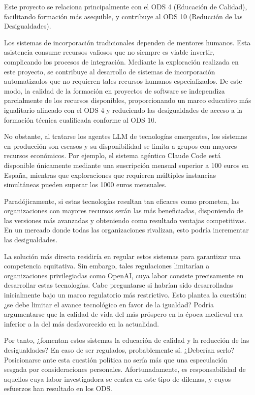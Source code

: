 Este proyecto se relaciona principalmente con el ODS 4 (Educación de Calidad), facilitando formación más asequible, y contribuye al ODS 10 (Reducción de las Desigualdades).

Los sistemas de incorporación tradicionales dependen de mentores humanos. Esta asistencia consume recursos valiosos que no siempre es viable invertir, complicando los procesos de integración. Mediante la exploración realizada en este proyecto, se contribuye al desarrollo de sistemas de incorporación automatizados que no requieren tales recursos humanos especializados. De este modo, la calidad de la formación en proyectos de software se independiza parcialmente de los recursos disponibles, proporcionando un marco educativo más igualitario alineado con el ODS 4 y reduciendo las desigualdades de acceso a la formación técnica cualificada conforme al ODS 10.

No obstante, al tratarse los agentes LLM de tecnologías emergentes, los sistemas en producción son escasos y su disponibilidad se limita a grupos con mayores recursos económicos. Por ejemplo, el sistema agéntico Claude Code está disponible únicamente mediante una suscripción mensual superior a 100 euros en España, mientras que exploraciones que requieren múltiples instancias simultáneas pueden superar los 1000 euros mensuales.

Paradójicamente, si estas tecnologías resultan tan eficaces como prometen, las organizaciones con mayores recursos serán las más beneficiadas, disponiendo de las versiones más avanzadas y obteniendo como resultado ventajas competitivas. En un mercado donde todas las organizaciones rivalizan, esto podría incrementar las desigualdades.

La solución más directa residiría en regular estos sistemas para garantizar una competencia equitativa. Sin embargo, tales regulaciones limitarían a organizaciones privilegiadas como OpenAI, cuya labor consiste precisamente en desarrollar estas tecnologías. Cabe preguntarse si habrían sido desarrolladas inicialmente bajo un marco regulatorio más restrictivo. Esto plantea la cuestión: ¿se debe limitar el avance tecnológico en favor de la igualdad? Podría argumentarse que la calidad de vida del más próspero en la época medieval era inferior a la del más desfavorecido en la actualidad.

Por tanto, ¿fomentan estos sistemas la educación de calidad y la reducción de las desigualdades? En caso de ser regulados, probablemente sí. ¿Deberían serlo? Posicionarse ante esta cuestión política no sería más que una especulación sesgada por consideraciones personales. Afortunadamente, es responsabilidad de aquellos cuya labor investigadora se centra en este tipo de dilemas, y cuyos esfuerzos han resultado en los ODS.
